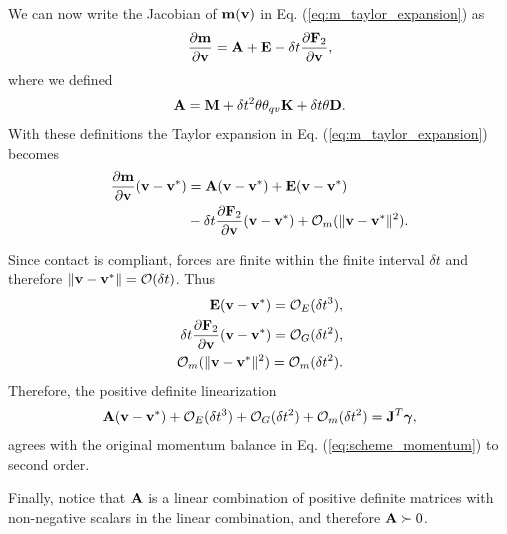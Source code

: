 We can now write the Jacobian of ${\mathbf{m}}({\mathbf{v}})$ in Eq.
(\ref{eq:m_taylor_expansion}) as
\begin{align*}
	\frac{\partial {\mathbf{m}}}{\partial {\mathbf{v}}} = {\mathbf{A}} + {\mathbf{E}} - \delta t\frac{\partial {\mathbf{F}}_2}{\partial {\mathbf{v}}},
\end{align*}
where we defined
\begin{align*}
	{\mathbf{A}}={\mathbf{M}}+ \delta t^2\theta\theta_{qv}{\mathbf{K}}+\delta t\theta{\mathbf{D}}.
\end{align*}
With these definitions the Taylor expansion in Eq. (\ref{eq:m_taylor_expansion})
becomes
\begin{align*}
	\frac{\partial{\mathbf{m}}}{\partial{\mathbf{v}}}({\mathbf{v}}-{\mathbf{v}}^*) &= {\mathbf{A}}({\mathbf{v}}-{\mathbf{v}}^*) + {\mathbf{E}}({\mathbf{v}}-{\mathbf{v}}^*) \\
	&- \delta t\frac{\partial{\mathbf{F}}_2}{\partial{\mathbf{v}}}({\mathbf{v}}-{\mathbf{v}}^*) + \mathcal{O}_m(\Vert{\mathbf{v}}-{\mathbf{v}}^*\Vert^2).
\end{align*}

Since contact is compliant, forces are finite within the finite interval $\delta
t$ and therefore $\Vert{\mathbf{v}}-{\mathbf{v}}^*\Vert=\mathcal{O}(\delta t)$. Thus
\begin{align*}
	{\mathbf{E}}({\mathbf{v}}-{\mathbf{v}}^*)=\mathcal{O}_E(\delta t^3), \\
    \delta t\frac{\partial {\mathbf{F}}_2}{\partial {\mathbf{v}}}({\mathbf{v}}-{\mathbf{v}}^*)=\mathcal{O}_G(\delta t^2), \\ 
    \mathcal{O}_m(\Vert{\mathbf{v}}-{\mathbf{v}}^*\Vert^2) = \mathcal{O}_m(\delta t^2).
\end{align*}
Therefore, the positive definite linearization
\begin{align*}
	{\mathbf{A}}({\mathbf{v}}-{\mathbf{v}}^*) + \mathcal{O}_E(\delta t^3) + \mathcal{O}_G(\delta t^2) +
	\mathcal{O}_m(\delta t^2) = {\mathbf{J}}^T{\mathbf{{\bm\gamma}}},
\end{align*}
agrees with the original momentum balance in Eq. (\ref{eq:scheme_momentum}) to second
order.

Finally, notice that ${\mathbf{A}}$ is a linear combination of positive definite
matrices with non-negative scalars in the linear combination, and therefore
${\mathbf{A}}\succ 0$.\hfill\IEEEQED
